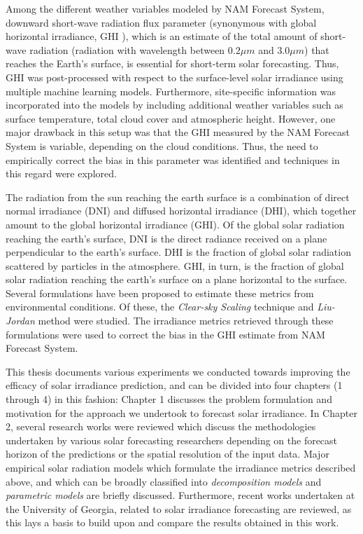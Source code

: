 \par Among the different weather variables modeled by NAM Forecast System, downward short-wave radiation flux parameter (synonymous with global horizontal irradiance, GHI \cite{multimodel_overpredict}), which is an estimate of the total amount of short-wave radiation (radiation with wavelength between $0.2\mu m$ and $3.0 \mu m$) that reaches the Earth's surface, is essential for short-term solar forecasting. Thus, GHI was post-processed with respect to the surface-level solar irradiance using multiple machine learning models. Furthermore, site-specific information was incorporated into the models by including additional weather variables such as surface temperature, total cloud cover and atmospheric height. However, one major drawback in this setup was that the GHI measured by the NAM Forecast System is  variable, depending on the cloud conditions. Thus, the need to empirically correct the bias in this parameter was identified and techniques in this regard were explored.

\par The radiation from the sun reaching the earth surface is a combination of direct normal irradiance (DNI) and diffused horizontal irradiance (DHI), which together amount to the global horizontal irradiance (GHI). Of the global solar radiation reaching the earth's surface, DNI is the direct radiance received on a plane perpendicular to the earth's surface. DHI is the fraction of global solar radiation scattered by particles in the atmosphere. GHI, in turn, is the fraction of global solar radiation reaching the earth's surface on a plane horizontal to the surface. Several formulations have been proposed to estimate these metrics from environmental conditions. Of these, the \textit{Clear-sky Scaling} technique \cite{pvlib_ineichen} and \textit{Liu-Jordan} \cite{pvlib_liujordan2} method were studied. The irradiance metrics retrieved through these formulations were used to correct the bias in the GHI estimate from NAM Forecast System. 

\par This thesis documents various experiments we conducted towards improving the efficacy of solar irradiance prediction, and can be divided into four chapters (1 through 4) in this fashion: Chapter 1 discusses the problem formulation and motivation for the approach we undertook to forecast solar irradiance. In Chapter 2, several research works were reviewed which discuss the methodologies undertaken by various solar forecasting researchers depending on the forecast horizon of the predictions or the spatial resolution of the input data. Major empirical solar radiation models which formulate the irradiance metrics described above, and which can be broadly classified into \textit{decomposition models} and \textit{parametric models} are briefly discussed. Furthermore, recent works undertaken at the University of Georgia, related to solar irradiance forecasting are reviewed, as this lays a basis to build upon and compare the results obtained in this work.

